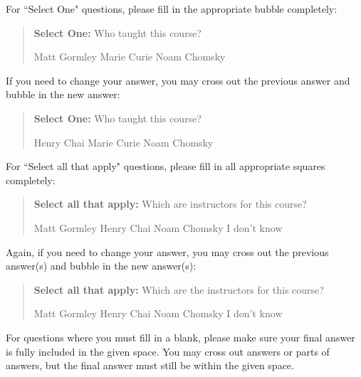 \documentclass[11pt,addpoints,answers]{exam}
\newcommand{\blackcircle}{\tikz\draw[black,fill=black] (0,0) circle (1ex);}
\begin{document}
For ``Select One" questions, please fill in the appropriate bubble completely:

\begin{quote}
\textbf{Select One:} Who taught this course?
    \begin{checkboxes}
     \CorrectChoice Matt Gormley
     \choice Marie Curie
     \choice Noam Chomsky
    \end{checkboxes}
\end{quote}

If you need to change your answer, you may cross out the previous answer and bubble in the new answer:

\begin{quote}
\textbf{Select One:} Who taught this course?
    {
    \begin{checkboxes}
     \CorrectChoice Henry Chai
     \choice Marie Curie \checkboxchar{\xcancel{\blackcircle}{}}
     \choice Noam Chomsky
    \end{checkboxes}
    }
\end{quote}

For ``Select all that apply" questions, please fill in all appropriate squares completely:

\begin{quote}
\textbf{Select all that apply:} Which are instructors for this course?
    {%
    \checkboxchar{$\Box$} \checkedchar{$\blacksquare$} %
    \begin{checkboxes}
    \CorrectChoice Matt Gormley  
    \CorrectChoice Henry Chai
    \choice Noam Chomsky
    \choice I don't know
    \end{checkboxes}
    }
\end{quote}

Again, if you need to change your answer, you may cross out the previous answer(s) and bubble in the new answer(s):

\begin{quote}
\textbf{Select all that apply:} Which are the instructors for this course?
    {%
    \checkboxchar{\xcancel{$\blacksquare$}} \checkedchar{$\blacksquare$} %
    \begin{checkboxes}
    \CorrectChoice Matt Gormley 
    \CorrectChoice Henry Chai
    \choice Noam Chomsky
    \choice I don't know
    \end{checkboxes}
    }
\end{quote}

For questions where you must fill in a blank, please make sure your final answer is fully included in the given space. You may cross out answers or parts of answers, but the final answer must still be within the given space.
\end{document}
